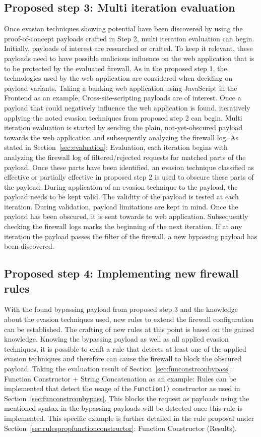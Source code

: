 \subsection{Proposed step 3: Multi iteration evaluation}
\label{sec:genericproposalstep3}
Once evasion techniques showing potential have been discovered by using the proof-of-concept payloads crafted in Step 2, multi iteration evaluation can begin. Initially, payloads of interest are researched or crafted. To keep it relevant, these payloads need to have possible malicious influence on the web application that is to be protected by the evaluated firewall. As in the proposed step 1, the technologies used by the web application are considered when deciding on payload variants. Taking a banking web application using JavaScript in the Frontend as an example, Cross-site-scripting payloads are of interest. Once a payload that could negatively influence the web application is found, iteratively applying the noted evasion techniques from proposed step 2 can begin. Multi iteration evaluation is started by sending the plain, not-yet-obscured payload towards the web application and subsequently analyzing the firewall log. As stated in Section~\ref{sec:evaluation}: Evaluation, each iteration begins with analyzing the firewall log of filtered/rejected requests for matched parts of the payload. Once these parts have been identified, an evasion technique classified as effective or partially effective in proposed step 2 is used to obscure these parts of the payload. During application of an evasion technique to the payload, the payload needs to be kept valid. The validity of the payload is tested at each iteration. During validation, payload limitations are kept in mind. Once the payload has been obscured, it is sent towards to web application. Subsequently checking the firewall logs marks the beginning of the next iteration. If at any iteration the payload passes the filter of the firewall, a new bypassing payload has been discovered.

\subsection{Proposed step 4: Implementing new firewall rules}
With the found bypassing payload from proposed step 3 and the knowledge about the evasion techniques used, new rules to extend the firewall configuration can be established. The crafting of new rules at this point is based on the gained knowledge. Knowing the bypassing payload as well as all applied evasion techniques, it is possible to craft a rule that detects at least one of the applied evasion techniques and therefore can cause the firewall to block the obscured payload. 
Taking the evaluation result of Section~\ref{sec:funconstrconbypass}: Function Constructor + String Concatenation as an example: Rules can be implemented that detect the usage of the \verb|Function()| constructor as used in Section~\ref{sec:funconstrconbypass}. This blocks the request as payloads using the mentioned syntax in the bypassing payloads will be detected once this rule is implemented. This specific example is further detailed in the rule proposal under Section~\ref{sec:rulespropfunctionconstructor}: Function Constructor (Results).

